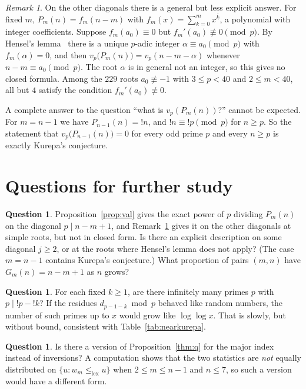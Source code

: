 \documentclass[11pt]{amsart}
\theoremstyle{plain}
\theoremstyle{definition}
\newtheorem{question}[theorem]{Question}
\theoremstyle{remark}
\newtheorem{remark}[theorem]{Remark}
\newcommand{\lexeq}{\le_{\mathrm{lex}}}
\begin{document}
\begin{remark}\label{rem:hensel}
On the other diagonals there is a general but less explicit answer. For fixed
$m$, $P_m(n)=f_m(n-m)$ with $f_m(x)=\sum_{k=0}^{m}x^{\overline{k}}$, a
polynomial with integer coefficients. Suppose $f_m(a_0)\equiv0$ but
$f_m'(a_0)\not\equiv0\pmod p$. By Hensel's lemma~\cite{Gouvea} there is a
unique $p$-adic integer $\alpha\equiv a_0\pmod p$ with $f_m(\alpha)=0$, and
then $v_p\bigl(P_m(n)\bigr)=v_p(n-m-\alpha)$ whenever $n-m\equiv a_0\pmod p$.
The root $\alpha$ is in general not an integer, so this gives no closed
formula. Among the $229$ roots $a_0\not\equiv-1$ with $3\le p<40$ and
$2\le m<40$, all but $4$ satisfy the condition $f_m'(a_0)\not\equiv0$.

A complete answer to the question ``what is $v_p(P_m(n))$?'' cannot be
expected. For $m=n-1$ we have $P_{n-1}(n)={!n}$, and $!n\equiv{!p}\pmod p$ for
$n\ge p$. So the statement that $v_p\bigl(P_{n-1}(n)\bigr)=0$ for every odd
prime $p$ and every $n\ge p$ is exactly Kurepa's conjecture.
\end{remark}

\section{Questions for further study}\label{sec:open}

\begin{question}
Proposition~\ref{prop:val} gives the exact power of $p$ dividing $P_m(n)$
on the diagonal $p\mid n-m+1$, and Remark~\ref{rem:hensel} gives it on the
other diagonals at simple roots, but not in closed form. Is there an explicit
description on some diagonal $j\ge2$, or at the roots where Hensel's lemma
does not apply? (The case $m=n-1$ contains Kurepa's conjecture.) What
proportion of pairs $(m,n)$ have $G_m(n)=n-m+1$ as $n$ grows?
\end{question}

\begin{question}
For each fixed $k\ge1$, are there infinitely many primes $p$ with
$p\mid{!p}-{!k}$? If the residues $d_{p-1-k}\bmod p$ behaved like random
numbers, the number of such primes up to $x$ would grow like $\log\log x$.
That is slowly, but without bound, consistent with
Table~\ref{tab:nearkurepa}.
\end{question}

\begin{question}
Is there a version of Proposition~\ref{thm:q} for the major index instead of
inversions? A computation shows that the two statistics are \emph{not}
equally distributed on $\{u: w_m\lexeq u\}$ when $2\le m\le n-1$ and $n\le7$,
so such a version would have a different form.
\end{question}
\end{document}
